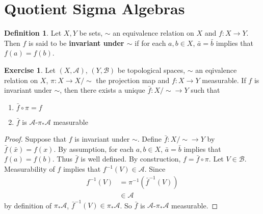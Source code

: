 \documentclass{book}
\theoremstyle{definition}
\newtheorem{defn}[definition]{Definition}
\newtheorem{ex}[definition]{Exercise}
\newcommand{\MA}{\mathcal{A}}
\newcommand{\MB}{\mathcal{B}}
\newcommand{\lex}[1]{\label{ex:#1}}
\DeclareMathOperator*{\0}{\mbf{0}}
\DeclareMathOperator*{\1}{\mbf{1}}
\begin{document}
	
	
	
	
	\newpage
	\section{Quotient Sigma Algebras}
	\begin{defn}
		Let $X,Y$ be sets, $\sim$ an equivalence relation on $X$ and $f: X \rightarrow Y$. Then $f$ is said to be \textbf{invariant under $\sim$} if for each $a,b \in X$, $\bar{a} = \bar{b}$ implies that $f(a) = f(b)$. 
	\end{defn}
	
	\begin{ex} \lex{}
		Let $(X, \MA)$, $(Y, \MB)$ be topological spaces, $\sim$ an eqivalence relation on $X$, $\pi:X \rightarrow X/\sim$ the projection map and $f:X \rightarrow Y$ measurable. If $f$ is invariant under $\sim$, then there exists a unique $\bar{f}:X / {\sim} \rightarrow Y$ such that 
		\begin{enumerate}
			\item $\bar{f} \circ \pi = f$
			\item $\bar{f}$ is $\MA$-$\pi_*\MA$ measurable 
		\end{enumerate}
	\end{ex}
	
	\begin{proof}
		Suppose that $f$ is invariant under $\sim$. Define $\bar{f}: X / {\sim} \rightarrow Y$ by $\bar{f}(\bar{x}) = f(x)$. By assumption, for each $a, b \in X$, $\bar{a} = \bar{b}$ implies that $f(a) = f(b)$. Thus $\bar{f}$ is well defined. By construction, $f = \bar{f} \circ \pi$. Let $V \in \MB$. Measurability of $f$ implies that $f^{-1}(V) \in \MA$. Since 
		\begin{align*}
			f^{-1}(V)
			&= \pi^{-1}(\bar{f}^{-1}(V)) \\
			& \in \MA
		\end{align*}
		by definition of $\pi_*\MA$, $\bar{f}^{-1}(V) \in \pi_*\MA$. So $\bar{f}$ is $\MA$-$\pi_*\MA$ measurable.
	\end{proof}
	
	
	
	
	
	
	
	
	
	
	
	
	
	
	
	
	
	
	
	
	
\end{document}
